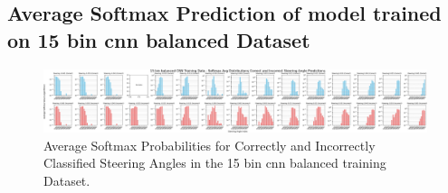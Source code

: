 
\subsection{Average Softmax Prediction of model trained on 15 bin cnn balanced Dataset}

\begin{figure}[H]
    \centering
    \includegraphics[width=1\linewidth]{Figures/Results/15_bins_cnn_softmax_dist_plot_balanced.png}
    \caption{Average Softmax Probabilities for Correctly and Incorrectly Classified Steering Angles in the 15 bin cnn balanced training Dataset.}
    \label{fig:15_bins_cnn_softmax_dist_balanced}
\end{figure}









